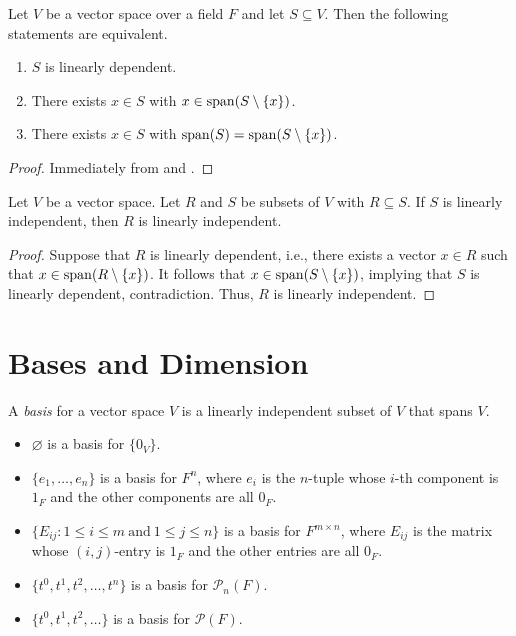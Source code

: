 \begin{theorem}
  \label{thm:linear-dependence-equivalence}
  Let $V$ be a vector space over a field $F$ and let $S \subseteq V$.
  Then the following statements are equivalent.
  \begin{enumerate}
    \item $S$ is linearly dependent.
    \item There exists $x \in S$ with $x \in \operatorname{span}(S \setminus \{x\})$.
    \item There exists $x \in S$ with $\operatorname{span}(S) = \operatorname{span}(S \setminus \{x\})$.
  \end{enumerate}
\end{theorem}
\begin{proof}
  Immediately from  and
  .
\end{proof}

\begin{theorem}
  \label{thm:linear-independence-subset}
  Let $V$ be a vector space.
  Let $R$ and $S$ be subsets of $V$ with $R \subseteq S$.
  If $S$ is linearly independent, then $R$ is linearly independent.
\end{theorem}
\begin{proof}
  Suppose that $R$ is linearly dependent, i.e., there exists a vector $x \in R$
  such that $x \in \operatorname{span}(R \setminus \{x\})$.
  It follows that $x \in \operatorname{span}(S \setminus \{x\})$, implying that $S$ is
  linearly dependent, contradiction.
  Thus, $R$ is linearly independent.
\end{proof}

\section{Bases and Dimension}
\begin{definition}\label{def:basis}
  A \emph{basis} for a vector space $V$ is a linearly independent subset of $V$
  that spans $V$.
\end{definition}

\begin{examples}
  \leavevmode
  \begin{itemize}
    \item $\varnothing$ is a basis for $\{0_V\}$.
    \item $\{e_1, \dots, e_n\}$ is a basis for $F^n$, where $e_i$ is the
      $n$-tuple whose $i$-th component is $1_F$ and the other components are
      all $0_F$.
    \item $\{E_{ij} : 1 \leq i \leq m\ \text{and}\ 1 \leq j \leq n\}$ is a
      basis for $F^{m \times n}$, where $E_{ij}$ is the matrix whose
      $(i, j)$-entry is $1_F$ and the other entries are all $0_F$.
    \item $\{t^0, t^1, t^2, \dots, t^n\}$ is a basis for $\mathcal{P}_n(F)$.
    \item $\{t^0, t^1, t^2, \dots\}$ is a basis for $\mathcal{P}(F)$.
  \end{itemize}
\end{examples}

